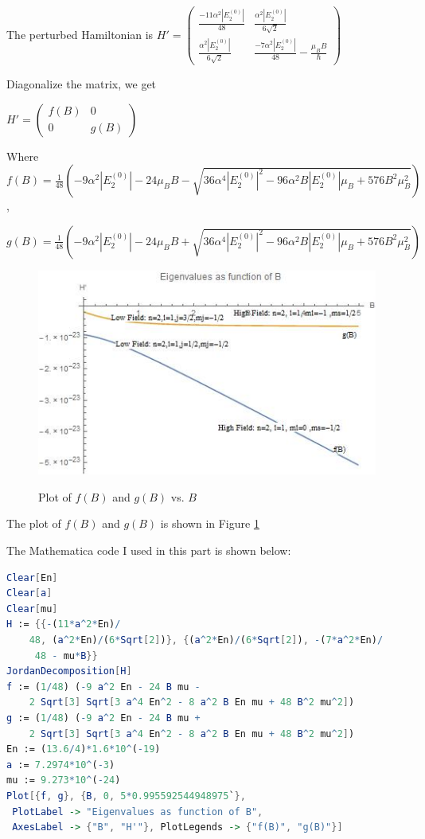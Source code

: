 \documentclass[12pt]{article}
\begin{document}
\begin{spacing}{2.0}
The perturbed Hamiltonian is $H'= \left(
\begin{array}{cc}
\frac{-11\alpha^2 |E_2^{(0)}|}{48} & \frac{\alpha^2 |E_2^{(0)}|}{6\sqrt{2}} \\
\frac{\alpha^2 |E_2^{(0)}|}{6\sqrt{2}} & \frac{-7\alpha^2 |E_2^{(0)}|}{48} -\frac{\mu_B B}{\hbar}
\end{array}
\right)$

Diagonalize the matrix, we get 

$H'= \left(
\begin{array}{cc}
f(B) & 0\\
0 & g(B)
\end{array}
\right)$

Where $f(B)=\frac{1}{48} \left(-9 \alpha^2 |E_2^{(0)}|-24\mu_B B-\sqrt{36 \alpha^4|E_2^{(0)}|^2-96 \alpha^2 B|E_2^{(0)}|\mu_B+ 576B^2\mu_B^2 }\right)$ ,

$g(B)=\frac{1}{48} \left(-9 \alpha^2 |E_2^{(0)}|-24\mu_B B+\sqrt{36 \alpha^4|E_2^{(0)}|^2-96 \alpha^2 B|E_2^{(0)}|\mu_B+ 576B^2\mu_B^2 }\right)$

\begin{figure}
  \centering
  \includegraphics[width=6in]{out1}\\
  \caption{Plot of $f(B)$ and $g(B)$ vs. $B$}\label{out1}
\end{figure}

The plot of $f(B)$ and $g(B)$ is shown in Figure \ref{out1}

The Mathematica code I used in this part is shown below:

\begin{lstlisting}[language=Mathematica,breaklines=true,frame=single]
Clear[En]
Clear[a]
Clear[mu]
H := {{-(11*a^2*En)/
    48, (a^2*En)/(6*Sqrt[2])}, {(a^2*En)/(6*Sqrt[2]), -(7*a^2*En)/
     48 - mu*B}}
JordanDecomposition[H]
f := (1/48) (-9 a^2 En - 24 B mu -
    2 Sqrt[3] Sqrt[3 a^4 En^2 - 8 a^2 B En mu + 48 B^2 mu^2])
g := (1/48) (-9 a^2 En - 24 B mu +
    2 Sqrt[3] Sqrt[3 a^4 En^2 - 8 a^2 B En mu + 48 B^2 mu^2])
En := (13.6/4)*1.6*10^(-19)
a := 7.2974*10^(-3)
mu := 9.273*10^(-24)
Plot[{f, g}, {B, 0, 5*0.995592544948975`},
 PlotLabel -> "Eigenvalues as function of B",
 AxesLabel -> {"B", "H'"}, PlotLegends -> {"f(B)", "g(B)"}]
\end{lstlisting}


\end{spacing}
\end{document}
